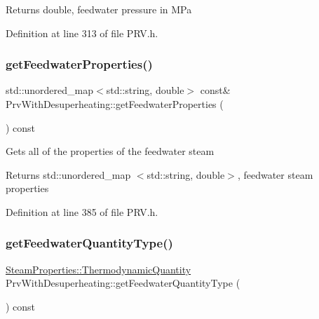 \begin{DoxyReturn}{Returns}
double, feedwater pressure in M\+Pa 
\end{DoxyReturn}


Definition at line 313 of file P\+R\+V.\+h.

\mbox{\label{class_prv_with_desuperheating_a5fbb776ba807118c8faaff03ba064a77}} 
\subsubsection{\texorpdfstring{get\+Feedwater\+Properties()}{getFeedwaterProperties()}}
{\footnotesize\ttfamily std\+::unordered\+\_\+map$<$std\+::string, double$>$ const\& Prv\+With\+Desuperheating\+::get\+Feedwater\+Properties (\begin{DoxyParamCaption}{ }\end{DoxyParamCaption}) const\hspace{0.3cm}{\ttfamily [inline]}}

Gets all of the properties of the feedwater steam \begin{DoxyReturn}{Returns}
std\+::unordered\+\_\+map $<$std\+::string, double$>$, feedwater steam properties 
\end{DoxyReturn}


Definition at line 385 of file P\+R\+V.\+h.

\mbox{\label{class_prv_with_desuperheating_aa6901e00ecf819d95f79c20ef1775876}} 
\subsubsection{\texorpdfstring{get\+Feedwater\+Quantity\+Type()}{getFeedwaterQuantityType()}}
{\footnotesize\ttfamily \hyperlink{class_steam_properties_ae0294bedf7d178c2d8fb6aed0f62fbff}{Steam\+Properties\+::\+Thermodynamic\+Quantity} Prv\+With\+Desuperheating\+::get\+Feedwater\+Quantity\+Type (\begin{DoxyParamCaption}{ }\end{DoxyParamCaption}) const\hspace{0.3cm}{\ttfamily [inline]}}

